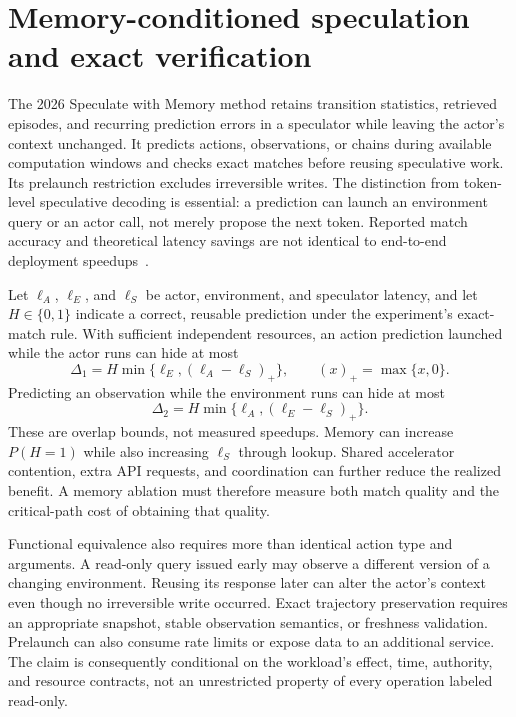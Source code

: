 \section{Memory-conditioned speculation and exact verification}
\label{sec:C31:memoryspeculation}
The 2026 Speculate with Memory method retains transition statistics, retrieved episodes, and recurring prediction errors in a speculator while leaving the actor's context unchanged. It predicts actions, observations, or chains during available computation windows and checks exact matches before reusing speculative work. Its prelaunch restriction excludes irreversible writes. The distinction from token-level speculative decoding is essential: a prediction can launch an environment query or an actor call, not merely propose the next token. Reported match accuracy and theoretical latency savings are not identical to end-to-end deployment speedups~\cite{root_specmemory2026}.

Let $\ell_A$, $\ell_E$, and $\ell_S$ be actor, environment, and speculator latency, and let $H\in\{0,1\}$ indicate a correct, reusable prediction under the experiment's exact-match rule. With sufficient independent resources, an action prediction launched while the actor runs can hide at most
\begin{equation}
 \Delta_1=H\min\{\ell_E,(\ell_A-\ell_S)_+\},
 \qquad (x)_+=\max\{x,0\}.
\end{equation}
Predicting an observation while the environment runs can hide at most
\begin{equation}
 \Delta_2=H\min\{\ell_A,(\ell_E-\ell_S)_+\}.
\end{equation}
These are overlap bounds, not measured speedups. Memory can increase $P(H=1)$ while also increasing $\ell_S$ through lookup. Shared accelerator contention, extra API requests, and coordination can further reduce the realized benefit. A memory ablation must therefore measure both match quality and the critical-path cost of obtaining that quality.

Functional equivalence also requires more than identical action type and arguments. A read-only query issued early may observe a different version of a changing environment. Reusing its response later can alter the actor's context even though no irreversible write occurred. Exact trajectory preservation requires an appropriate snapshot, stable observation semantics, or freshness validation. Prelaunch can also consume rate limits or expose data to an additional service. The claim is consequently conditional on the workload's effect, time, authority, and resource contracts, not an unrestricted property of every operation labeled read-only.

